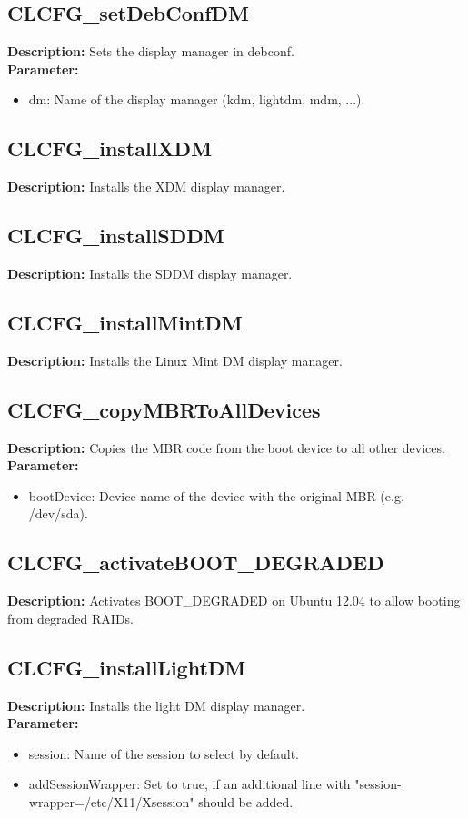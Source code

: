 \subsection{CLCFG\_setDebConfDM}
\textbf{Description:} Sets the display manager in debconf.\\
\textbf{Parameter:}
\begin{itemize}
\item dm: Name of the display manager (kdm, lightdm, mdm, ...).
\end{itemize}

\subsection{CLCFG\_installXDM}
\textbf{Description:} Installs the XDM display manager.\\

\subsection{CLCFG\_installSDDM}
\textbf{Description:} Installs the SDDM display manager.\\

\subsection{CLCFG\_installMintDM}
\textbf{Description:} Installs the Linux Mint DM display manager.\\

\subsection{CLCFG\_copyMBRToAllDevices}
\textbf{Description:} Copies the MBR code from the boot device to all other devices.\\
\textbf{Parameter:}
\begin{itemize}
\item bootDevice: Device name of the device with the original MBR (e.g. /dev/sda).
\end{itemize}

\subsection{CLCFG\_activateBOOT\_DEGRADED}
\textbf{Description:} Activates BOOT\_DEGRADED on Ubuntu 12.04 to allow booting from degraded RAIDs.\\

\subsection{CLCFG\_installLightDM}
\textbf{Description:} Installs the light DM display manager.\\
\textbf{Parameter:}
\begin{itemize}
\item session: Name of the session to select by default.
\item addSessionWrapper: Set to true, if an additional line with "session-wrapper=/etc/X11/Xsession" should be added.
\end{itemize}

